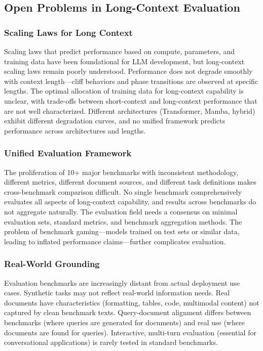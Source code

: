 \documentclass[11pt,letterpaper]{article}
\begin{document}
\subsection{Open Problems in Long-Context Evaluation}

\subsubsection{Scaling Laws for Long Context}

Scaling laws that predict performance based on compute, parameters, and training data have been foundational for LLM development, but long-context scaling laws remain poorly understood. Performance does not degrade smoothly with context length---cliff behaviors and phase transitions are observed at specific lengths. The optimal allocation of training data for long-context capability is unclear, with trade-offs between short-context and long-context performance that are not well characterized. Different architectures (Transformer, Mamba, hybrid) exhibit different degradation curves, and no unified framework predicts performance across architectures and lengths.

\subsubsection{Unified Evaluation Framework}

The proliferation of 10+ major benchmarks with inconsistent methodology, different metrics, different document sources, and different task definitions makes cross-benchmark comparison difficult. No single benchmark comprehensively evaluates all aspects of long-context capability, and results across benchmarks do not aggregate naturally. The evaluation field needs a consensus on minimal evaluation sets, standard metrics, and benchmark aggregation methods. The problem of benchmark gaming---models trained on test sets or similar data, leading to inflated performance claims---further complicates evaluation.

\subsubsection{Real-World Grounding}

Evaluation benchmarks are increasingly distant from actual deployment use cases. Synthetic tasks may not reflect real-world information needs. Real documents have characteristics (formatting, tables, code, multimodal content) not captured by clean benchmark texts. Query-document alignment differs between benchmarks (where queries are generated for documents) and real use (where documents are found for queries). Interactive, multi-turn evaluation (essential for conversational applications) is rarely tested in standard benchmarks.
\end{document}
